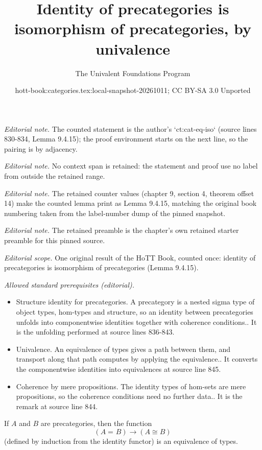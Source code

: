 \documentclass[10pt,a4paper]{article}
\title{Identity of precategories is isomorphism of precategories, by univalence}
\author{The Univalent Foundations Program}
\date{hott-book:categories.tex:local-snapshot-20261011; CC BY-SA 3.0 Unported}
\newcounter{chapter}
\newcommand{\id}[3][]{\ensuremath{#2 =_{#1} #3}\xspace}
\theoremstyle{definition}
\theoremstyle{remark}
\numberwithin{equation}{section}
\begin{document}
\maketitle
\setcounter{chapter}{9}
\setcounter{section}{4}
\setcounter{thm}{14}
\noindent\textit{Editorial note.} The counted statement is the author's `ct:cat-eq-iso` (source lines 830-834, Lemma 9.4.15); the proof environment starts on the next line, so the pairing is by adjacency.\par\medskip
\noindent\textit{Editorial note.} No context span is retained: the statement and proof use no label from outside the retained range.\par\medskip
\noindent\textit{Editorial note.} The retained counter values (chapter 9, section 4, theorem offset 14) make the counted lemma print as Lemma 9.4.15, matching the original book numbering taken from the label-number dump of the pinned snapshot.\par\medskip
\noindent\textit{Editorial note.} The retained preamble is the chapter's own retained starter preamble for this pinned source.\par\medskip
\noindent\textit{Editorial scope.} One original result of the HoTT Book, counted once: identity of precategories is isomorphism of precategories (Lemma 9.4.15).\par\medskip
\noindent\textit{Allowed standard prerequisites (editorial).}\begin{itemize}
\item Structure identity for precategories. A precategory is a nested sigma type of object types, hom-types and structure, so an identity between precategories unfolds into componentwise identities together with coherence conditions.. It is the unfolding performed at source lines 836-843.
\item Univalence. An equivalence of types gives a path between them, and transport along that path computes by applying the equivalence.. It converts the componentwise identities into equivalences at source line 845.
\item Coherence by mere propositions. The identity types of hom-sets are mere propositions, so the coherence conditions need no further data.. It is the remark at source line 844.
\end{itemize}\medskip
\begin{lem}\label{ct:cat-eq-iso}
  If $A$ and $B$ are precategories, then the function
  \[(\id A B) \to (A\cong B)\]
  (defined by induction from the identity functor) is an equivalence of types.
\end{lem}
\end{document}
